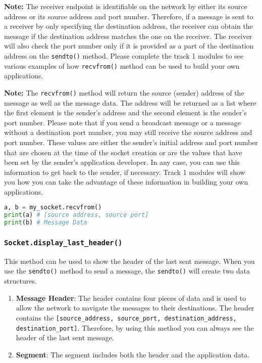 \documentclass[11pt]{article}
\begin{document}
\textbf{Note:}
The receiver endpoint is identifiable on the network by either its source address or its source address and port number.
Therefore, if a message is sent to a receiver by only specifying the destination address, the receiver can obtain the message if the destination address matches the one on the receiver. The receiver will also check the port number only if it is provided as a part of the destination address on the \texttt{sendto()} method. Please complete the track 1 modules to see various examples of how \texttt{recvfrom()} method can be used to build your own applications.

\textbf{Note:}
The \texttt{recvfrom()} method will return the source (sender) address of the message as well as the message data.
The address will be returned as a list where the first element is the sender's address and the second element is the sender's port number.
Please note that if you send a broadcast message or a message without a destination port number, you may still receive the source address and port number.
These values are either the sender's initial address and port number that are chosen at the time of the socket creation or are the values that have been set by the sender's application developer. In any case, you can use this information to get back to the sender, if necessary. Track 1 modules will show you how you can take the advantage of these information in building your own applications.

\begin{lstlisting}[caption={Example for using \texttt{recvfrom()}}, language=Python]
a, b = my_socket.recvfrom()
print(a) # [source address, source port]
print(b) # Message Data
\end{lstlisting}

\subsubsection{\texttt{Socket.display\_last\_header()}}
This method can be used to show the header of the last sent message. When you use the \texttt{sendto()} method to send a message, the \texttt{sendto()} will create two data structures.
\begin{enumerate}
    \item \textbf{Message Header}: The header contains four pieces of data and is used to allow the network to navigate the messages to their destinations. The header contains the \texttt{[source\_address, source\_port, destination\_address, destination\_port]}. Therefore, by using this method you can always see the header of the last sent message.
    \item \textbf{Segment}: The segment includes both the header and the application data.
\end{enumerate}
\end{document}
